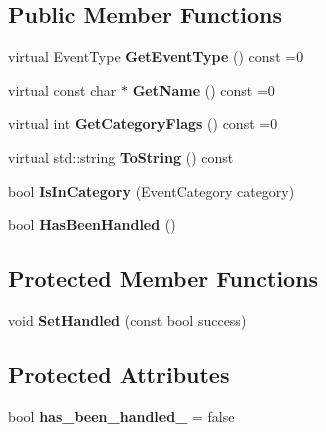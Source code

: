 \subsection*{Public Member Functions}
\begin{DoxyCompactItemize}
\item 
\mbox{\label{classengine_1_1events_1_1Event_a99604df0759386f2cea0071efa52d6e9}} 
virtual Event\+Type {\bfseries Get\+Event\+Type} () const =0
\item 
\mbox{\label{classengine_1_1events_1_1Event_a11bf339abb972f3c06f1cf20a0ff894b}} 
virtual const char $\ast$ {\bfseries Get\+Name} () const =0
\item 
\mbox{\label{classengine_1_1events_1_1Event_a24e56efda02b259ac08ecc5ade26963d}} 
virtual int {\bfseries Get\+Category\+Flags} () const =0
\item 
\mbox{\label{classengine_1_1events_1_1Event_afad3baa55387283c7cfe692292edc269}} 
virtual std\+::string {\bfseries To\+String} () const
\item 
\mbox{\label{classengine_1_1events_1_1Event_a1f55831a2eb7d5a22125e347fb6673a3}} 
bool {\bfseries Is\+In\+Category} (Event\+Category category)
\item 
\mbox{\label{classengine_1_1events_1_1Event_a39202ff693f2701f2f736dfd0b4f3878}} 
bool {\bfseries Has\+Been\+Handled} ()
\end{DoxyCompactItemize}
\subsection*{Protected Member Functions}
\begin{DoxyCompactItemize}
\item 
\mbox{\label{classengine_1_1events_1_1Event_aa85c36143880a3312b1c63166463ef5d}} 
void {\bfseries Set\+Handled} (const bool success)
\end{DoxyCompactItemize}
\subsection*{Protected Attributes}
\begin{DoxyCompactItemize}
\item 
\mbox{\label{classengine_1_1events_1_1Event_ad8e1eb6634225e11963228d6a69c166b}} 
bool {\bfseries has\+\_\+been\+\_\+handled\+\_\+} = false
\end{DoxyCompactItemize}
